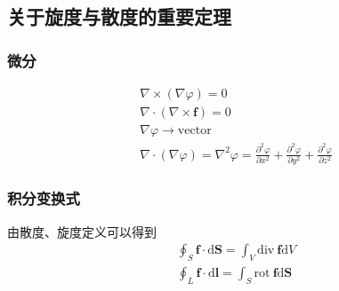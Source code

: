 \documentclass[main.tex]{subfiles}
\begin{document}
\subsection{关于旋度与散度的重要定理}
\subsubsection{微分}
\begin{align}
    &\nabla \times (\nabla \varphi ) = 0\\
    &\nabla \cdot (\nabla \times \boldsymbol{f} ) = 0\\
    &\nabla \varphi \to \mathrm{vector}\\
    &\nabla \cdot (\nabla \varphi ) = \nabla ^2 \varphi = \frac{\partial ^2 \varphi}{\partial x^2}+\frac{\partial ^2 \varphi}{\partial y^2}+\frac{\partial ^2 \varphi}{\partial z^2}
\end{align}

\subsubsection{积分变换式}
由散度、旋度定义可以得到
\begin{align}
    \label{jifenbianhuan1}&\oint_{S}^{}\boldsymbol{f}\cdot \mathrm{d}\boldsymbol{S} = \int_{V}^{} \mathrm{div}\ \boldsymbol{f}\mathrm{d}V\\
    \label{jifenbianhuan2}&\oint_{L}^{}\boldsymbol{f}\cdot \mathrm{d}\boldsymbol{l} = \int_{S}^{} \mathrm{rot}\ \boldsymbol{f}\mathrm{d}\boldsymbol{S}
\end{align}
\end{document}
